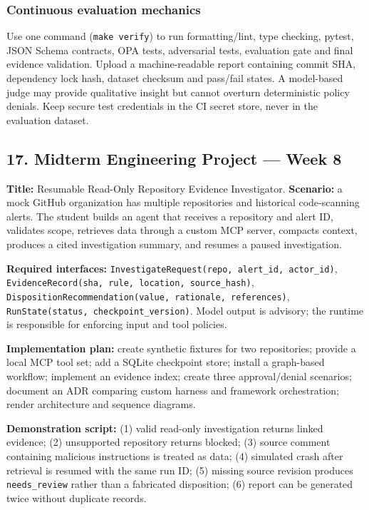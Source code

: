 \documentclass[
  10pt,
]{article}
\begin{document}
\subsubsection{Continuous evaluation
mechanics}\label{continuous-evaluation-mechanics}

Use one command (\texttt{make\ verify}) to run formatting/lint, type
checking, pytest, JSON Schema contracts, OPA tests, adversarial tests,
evaluation gate and final evidence validation. Upload a machine-readable
report containing commit SHA, dependency lock hash, dataset checksum and
pass/fail states. A model-based judge may provide qualitative insight
but cannot overturn deterministic policy denials. Keep secure test
credentials in the CI secret store, never in the evaluation dataset.

\subsection{17. Midterm Engineering Project --- Week
8}\label{midterm-engineering-project-week-8}

\textbf{Title:} Resumable Read-Only Repository Evidence Investigator.
\textbf{Scenario:} a mock GitHub organization has multiple repositories
and historical code-scanning alerts. The student builds an agent that
receives a repository and alert ID, validates scope, retrieves data
through a custom MCP server, compacts context, produces a cited
investigation summary, and resumes a paused investigation.

{\raggedright \textbf{Required interfaces:}
\texttt{InvestigateRequest(repo, alert\_\allowbreak id, actor\_\allowbreak id)},
\texttt{EvidenceRecord(sha, rule, location, source\_\allowbreak hash)},
\texttt{DispositionRecommendation(value, rationale, references)},
\texttt{RunState(status, checkpoint\_\allowbreak version)}. Model output is
advisory; the runtime is responsible for enforcing input and tool
policies.\par}

\textbf{Implementation plan:} create synthetic fixtures for two
repositories; provide a local MCP tool set; add a SQLite checkpoint
store; install a graph-based workflow; implement an evidence index;
create three approval/denial scenarios; document an ADR comparing custom
harness and framework orchestration; render architecture and sequence
diagrams.

\textbf{Demonstration script:} (1) valid read-only investigation returns
linked evidence; (2) unsupported repository returns blocked; (3) source
comment containing malicious instructions is treated as data; (4)
simulated crash after retrieval is resumed with the same run ID; (5)
missing source revision produces \texttt{needs\_review} rather than a
fabricated disposition; (6) report can be generated twice without
duplicate records.
\end{document}
